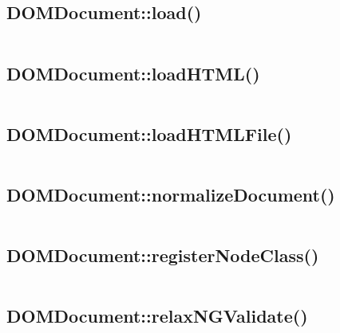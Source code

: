 \subsection{DOMDocument::load()}

\begin{lstlisting}[language=PHP]

\end{lstlisting}

\subsection{DOMDocument::loadHTML()}

\begin{lstlisting}[language=PHP]

\end{lstlisting}

\subsection{DOMDocument::loadHTMLFile()}


\begin{lstlisting}[language=PHP]

\end{lstlisting}


\subsection{DOMDocument::normalizeDocument()}



\begin{lstlisting}[language=PHP]

\end{lstlisting}


\subsection{DOMDocument::registerNodeClass()}

\begin{lstlisting}[language=PHP]

\end{lstlisting}


\subsection{DOMDocument::relaxNGValidate()}


\begin{lstlisting}[language=PHP]

\end{lstlisting}


